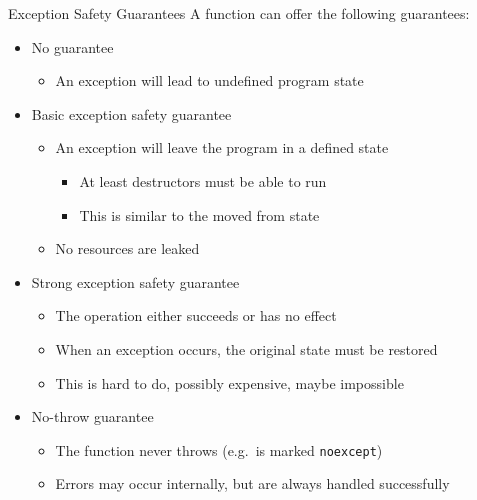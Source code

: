 \begin{advanced}
\begin{frame}[fragile]
  \begin{block}{Exception Safety Guarantees}
    A function can offer the following guarantees:
    \begin{itemize}
      \item No guarantee
      \begin{itemize}
        \item An exception will lead to undefined program state
      \end{itemize}
      \item Basic exception safety guarantee
      \begin{itemize}
        \item An exception will leave the program in a defined state
        \begin{itemize}
          \item At least destructors must be able to run
          \item This is similar to the moved from state
        \end{itemize}
        \item No resources are leaked
      \end{itemize}
      \item Strong exception safety guarantee
      \begin{itemize}
        \item The operation either succeeds or has no effect
        \item When an exception occurs, the original state must be restored
        \item This is hard to do, possibly expensive, maybe impossible
      \end{itemize}
      \item No-throw guarantee
      \begin{itemize}
        \item The function never throws (e.g.\ is marked \texttt{noexcept})
        \item Errors may occur internally, but are always handled successfully
      \end{itemize}
    \end{itemize}
  \end{block}
\end{frame}


\end{advanced}
